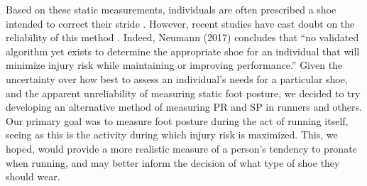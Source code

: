 Based on these static measurements, individuals are often prescribed a shoe intended to correct their stride \parencite{neumann}.
However, recent studies have cast doubt on the reliability of this method \parencite{richards}.
Indeed, Neumann (2017) concludes that “no validated algorithm yet exists to determine the appropriate shoe for an individual that will minimize injury risk while maintaining or improving performance.”
Given the uncertainty over how best to assess an individual’s needs for a particular shoe, and the apparent unreliability of measuring static foot posture, we decided to try developing an alternative method of measuring PR and SP in runners and others.  Our primary goal was to measure foot posture during the act of running itself, seeing as this is the activity during which injury risk is maximized.  This, we hoped, would provide a more realistic measure of a person’s tendency to pronate when running, and may better inform the decision of what type of shoe they should wear.
